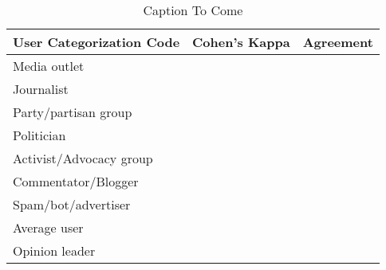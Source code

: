 \documentclass[a4paper,12pt]{article}
\begin{document}
\begin{table}[position specifier]\footnotesize
  \centering
  \begin{tabular}{| l | l | l |}
    \hline
    User Categorization Code & Cohen's Kappa & Agreement \\ \hline
    Media outlet & &  \\ \hline
    Journalist & &  \\ \hline
    Party/partisan group & &  \\ \hline
    Politician & &  \\ \hline
    Activist/Advocacy group & &  \\ \hline
    Commentator/Blogger & &  \\ \hline
    Spam/bot/advertiser & &  \\ \hline
    Average user & &  \\ \hline
    Opinion leader & &  \\ \hline
  \end{tabular}
  \caption{Caption To Come}
  \label{tab:elizabeth_table_two}
\end{table}
\clearpage
\end{document}

